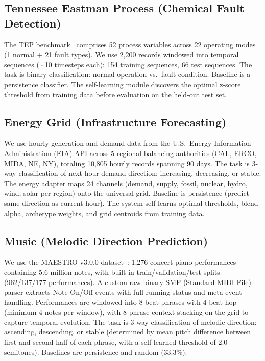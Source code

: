 \documentclass[11pt,a4paper]{article}
\begin{document}
\subsection{Tennessee Eastman Process (Chemical Fault Detection)}
The TEP benchmark~\citep{downs1993} comprises 52 process variables across 22 operating
modes (1 normal + 21 fault types). We use 2,200 records windowed into temporal sequences
($\sim$10 timesteps each): 154 training sequences, 66 test sequences. The task is binary
classification: normal operation vs.\ fault condition. Baseline is a persistence
classifier. The self-learning module discovers the optimal z-score threshold from
training data before evaluation on the held-out test set.

\subsection{Energy Grid (Infrastructure Forecasting)}
We use hourly generation and demand data from the U.S.\ Energy Information
Administration (EIA) API across 5 regional balancing authorities (CAL, ERCO,
MIDA, NE, NY), totaling 10,805 hourly records spanning 90 days. The task is
3-way classification of next-hour demand direction: increasing, decreasing, or
stable. The energy adapter maps 24 channels (demand, supply, fossil, nuclear,
hydro, wind, solar per region) onto the universal grid. Baseline is persistence
(predict same direction as current hour). The system self-learns optimal thresholds,
blend alpha, archetype weights, and grid centroids from training data.

\subsection{Music (Melodic Direction Prediction)}
We use the MAESTRO v3.0.0 dataset~\citep{maestro2019}: 1,276 concert piano performances
containing 5.6 million notes, with built-in train/validation/test splits
(962/137/177 performances). A custom raw binary SMF (Standard MIDI File) parser
extracts Note On/Off events with full running-status and meta-event handling.
Performances are windowed into 8-beat phrases with 4-beat hop (minimum 4
notes per window), with 8-phrase context stacking on the grid to capture
temporal evolution. The task is 3-way classification of melodic direction:
ascending, descending, or stable (determined by mean pitch difference between
first and second half of each phrase, with a self-learned threshold of 2.0
semitones). Baselines are persistence and random (33.3\%).
\end{document}
